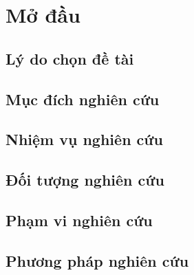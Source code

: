 \chapter*{Mở đầu}

\renewcommand*{\thesection}{\arabic{section}}
\renewcommand*{\thesubsection}{\alph{subsection}}

\section{Lý do chọn đề tài}
\blindtext
\section{Mục đích nghiên cứu}
\blindtext
\section{Nhiệm vụ nghiên cứu}
\blindtext
\section{Đối tượng nghiên cứu}
\blindtext
\section{Phạm vi nghiên cứu}
\blindtext
\section{Phương pháp nghiên cứu}
\blindtext

\renewcommand*{\thesection}{\arabic{chapter}.\arabic{section}}
\renewcommand*{\thesubsection}{\arabic{chapter}.\arabic{section}.\arabic{subsection}}
